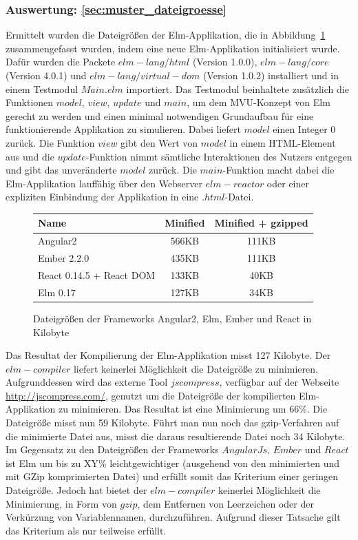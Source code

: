 \subsubsection{Auswertung: \ref{sec:muster_dateigroesse} }
Ermittelt wurden die Dateigrößen der Elm-Applikation, die in Abbildung~\ref{fig:dateigroesse-stats} zusammengefasst wurden, indem eine neue Elm-Applikation initialisiert wurde. Dafür wurden die Packete $elm-lang/html$ (Version 1.0.0), $elm-lang/core$ (Version 4.0.1) und $elm-lang/virtual-dom$ (Version 1.0.2) installiert und in einem Testmodul $Main.elm$ importiert.
Das Testmodul beinhaltete zusätzlich die Funktionen $model$, $view$, $update$ und $main$, um dem \ac{MVU}-Konzept von Elm gerecht zu werden und einen minimal notwendigen Grundaufbau für eine funktionierende Applikation zu simulieren. Dabei liefert $model$ einen Integer $0$ zurück. Die Funktion $view$ gibt den Wert von $model$ in einem \ac{HTML}-Element aus und die $update$-Funktion nimmt sämtliche Interaktionen des Nutzers entgegen und gibt das unveränderte $model$ zurück. Die $main$-Funktion macht dabei die Elm-Applikation lauffähig über den Webserver $elm-reactor$ oder einer expliziten Einbindung der Applikation in eine $.html$-Datei. 
\begin{figure}[h!]
	\begin{tabular}{ | p{7cm} | c | c |}
	\hline
	 \textbf{Name} 				& \textbf{Minified} 	& \textbf{Minified + gzipped}\\
	 \hline
	 Angular2 					& 566KB	& 111KB\\
	 \hline
	 Ember 2.2.0 				& 435KB & 111KB\\
	 \hline
	 React 0.14.5 + React DOM	& 133KB & 40KB\\
	 \hline
	 Elm 0.17					& 127KB & 34KB\\
	 \hline
	\end{tabular}
\caption{Dateigrößen der Frameworks Angular2, Elm, Ember und React in Kilobyte}\label{fig:dateigroesse-stats}
\end{figure}
Das Resultat der Kompilierung der Elm-Applikation misst 127 Kilobyte. Der $elm-compiler$ liefert keinerlei Möglichkeit die Dateigröße zu minimieren. Aufgrunddessen wird das externe Tool $jscompress$, verfügbar auf der Webseite \url{http://jscompress.com/}, genutzt um die Dateigröße der kompilierten Elm-Applikation zu minimieren. Das Resultat ist eine Minimierung um 66\%. Die Dateigröße misst nun 59 Kilobyte. Führt man nun noch das gzip-Verfahren auf die minimierte Datei aus, misst die daraus resultierende Datei noch 34 Kilobyte. Im Gegensatz zu den Dateigrößen der Frameworks $AngularJs$, $Ember$ und $React$ ist Elm um bis zu XY\% leichtgewichtiger (ausgehend von den minimierten und mit GZip komprimierten Datei) und erfüllt somit das Kriterium einer geringen Dateigröße. Jedoch hat bietet der $elm-compiler$ keinerlei Möglichkeit die Minimierung, in Form von $gzip$, dem Entfernen von Leerzeichen oder der Verkürzung von Variablennamen, durchzuführen. Aufgrund dieser Tatsache gilt das Kriterium als nur teilweise erfüllt.


